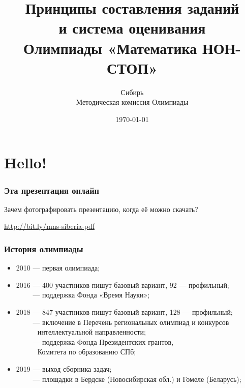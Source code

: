 \documentclass[aspectratio=1610,12pt]{beamer}
\title[Математика НОН-СТОП $\mid$ Семинар]
	{\bfseries Принципы составления заданий \\
		и система оценивания \\
		Олимпиады «Математика НОН-СТОП»}
\author[Б.~А.~Золотов, Е.~И.~Тодоров]
	{Сибирь \\ \vspace{0.3cm} Методическая комиссия Олимпиады}
\institute[\textcolor{white}{«Время науки», ЛНМО, ФПГ}]{}
\date{\today}
\begin{document}
\section[Приветствие]{Hello!}
\begin{frame}\titlepage\end{frame}

\begin{frame} \frametitle{Эта презентация онлайн}
\begin{center}
\vspace{-3mm}
Зачем фотографировать презентацию, когда её можно скачать?\vspace{4mm}

		\vspace{4mm}
		
		\url{http://bit.ly/mns-siberia-pdf}
\end{center}
\end{frame}



\begin{frame}\frametitle{История олимпиады}
\begin{itemize}
	\item 2010 — первая олимпиада;
	\item 2016 — 400 участников пишут базовый вариант, 92 --- профильный;\\
        $\phantom{2016}$ — поддержка Фонда «Время Науки»;
	\item 2018 — 847 участников пишут базовый вариант, 128 --- профильный;\\
        $\phantom{2018}$ — включение в Перечень региональных олимпиад и конкурсов\\
	$\phantom{2018 — }$\quad интеллектуальной направленности;\\
	$\phantom{2018}$ — поддержка Фонда Президентских грантов,\\
	$\phantom{2018 — }$\quad Комитета по образованию СПб;\\
	\item 2019 — выход сборника задач;\\
        $\phantom{2019}$ — площадки в Бердске (Новосибирская обл.) и Гомеле (Беларусь);\\
\end{itemize}\end{frame}
\end{document}

